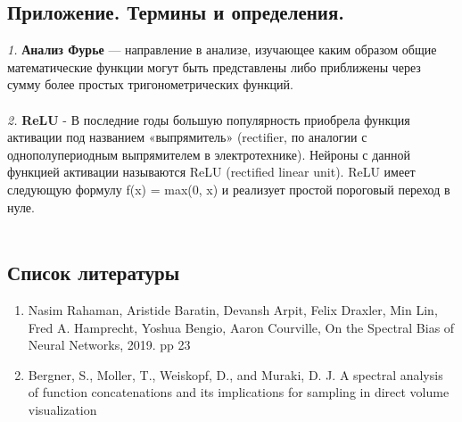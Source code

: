 \documentclass{article}
\begin{document}
    \newpage
    \begin{center} 
    \section{Приложение. Термины и определения.}
    \end{center} 
    \large 
    \textit{1.}
    \textbf{Анализ Фурье} — направление в анализе, изучающее каким образом общие математические функции могут быть представлены либо приближены через сумму более простых тригонометрических функций. 
    \\ \\
    \textit{2.}
    \textbf{ReLU} - В последние годы большую популярность приобрела функция активации под названием «выпрямитель» (rectifier, по аналогии с однополупериодным выпрямителем в электротехнике). Нейроны с данной функцией активации называются ReLU (rectified linear unit). ReLU имеет следующую формулу f(x) = max(0, x) и реализует простой пороговый переход в нуле.
    \\ \\
    
    \newpage
    \begin{center} 
    \section{Список литературы}
    \end{center}
    \large
    \begin{enumerate} 
    \item Nasim Rahaman, Aristide Baratin, Devansh Arpit, Felix Draxler, Min Lin, Fred A. Hamprecht, Yoshua Bengio, Aaron Courville, On the Spectral Bias of Neural Networks, 2019. pp 23
    \item Bergner, S., Moller, T., Weiskopf, D., and Muraki, D. J. A spectral analysis of function concatenations and its implications for sampling in direct volume visualization
    \end{enumerate}
    
\end{document}
